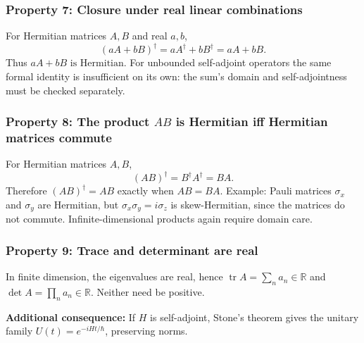 \documentclass[11pt,a4paper]{article}
\newcommand{\R}{\mathbb R}
\newcommand{\tr}{\operatorname{tr}}
\begin{document}
\subsubsection{Property 7: Closure under real linear combinations}
For Hermitian matrices $A,B$ and real $a,b$,
\begin{equation}
(aA+bB)^\dagger=aA^\dagger+bB^\dagger=aA+bB.
\end{equation}
Thus $\boxed{aA+bB\text{ is Hermitian}}$. For unbounded self-adjoint operators the same formal identity is insufficient on its own: the sum's domain and self-adjointness must be checked separately.

\subsubsection{Property 8: The product $AB$ is Hermitian iff Hermitian matrices commute}
For Hermitian matrices $A,B$,
\begin{equation}
(AB)^\dagger=B^\dagger A^\dagger=BA.
\end{equation}
Therefore $(AB)^\dagger=AB$ exactly when $\boxed{AB=BA}$. Example: Pauli matrices $\sigma_x$ and $\sigma_y$ are Hermitian, but $\sigma_x\sigma_y=i\sigma_z$ is skew-Hermitian, since the matrices do not commute. Infinite-dimensional products again require domain care.

\subsubsection{Property 9: Trace and determinant are real}
In finite dimension, the eigenvalues are real, hence $\tr A=\sum_n a_n\in\R$ and $\det A=\prod_n a_n\in\R$. Neither need be positive.\par
\textbf{Additional consequence:} If $H$ is self-adjoint, Stone's theorem gives the unitary family $U(t)=e^{-iHt/\hbar}$, preserving norms.
\end{document}
